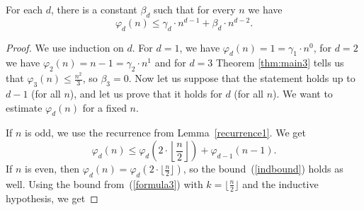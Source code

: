 \documentclass[11pt,a4paper]{article}
\DeclarePairedDelimiter{\floor}{\lfloor}{\rfloor}
\begin{document}
\begin{theorem}
    For each $d$, there is a constant $\beta_d$ such that for every $n$ we have
    \[ \varphi_d(n) \leq \gamma_d \cdot n^{d-1} +\beta_d \cdot n^{d-2}.
    \]
\end{theorem}

\begin{proof}
    We use induction on $d$. For $d=1$, we have $\varphi_d(n)=1=\gamma_1\cdot n^0$, for $d=2$ we have $\varphi_2(n)=n-1=\gamma_2\cdot n^1$ and for $d=3$ Theorem \ref{thm:main3} %
    tells us that $\varphi_3(n) \leq \frac{n^2}{3}$, so $\beta_3=0$. Now let us suppose that the statement holds up to $d-1$ (for all $n$), and let us prove that it holds for $d$ (for all $n$). We want to estimate $\varphi_d(n)$ for a fixed $n$.

    If $n$ is odd, we use the recurrence from Lemma~\ref{recurrence1}. We get
    \begin{equation}\label{indbound}
        \varphi_d(n)\leq %
        \varphi_d\left(2\cdot \left\lfloor \frac{n}{2} \right\rfloor \right)+\varphi_{d-1}(n-1).
    \end{equation}
    If $n$ is even, then $\varphi_d(n)=\varphi_d\left(2\cdot \lfloor \frac{n}{2} \rfloor \right)$, so the bound~(\ref{indbound}) holds as well. Using the bound from~(\ref{formula3}) with $k= \lfloor \frac{n}{2} \rfloor$ and the  inductive hypothesis, we get


\end{proof}
\end{document}
